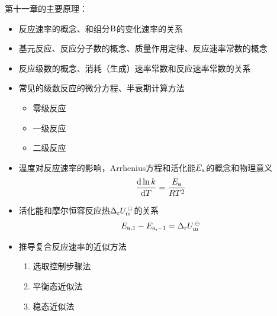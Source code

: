 \documentclass[9pt]{beamer}
\newcommand\B{{\rm B}}
\newcommand*{\dif}{\mathop{}\!\mathrm{d}}
\newcommand\m{{\rm m}}
\newcommand\rr{{\rm r}}
\begin{document}
	\begin{frame}
	
	第十一章的主要原理：
	\begin{itemize}
	
	\item 反应速率的概念、和组分$\B$的变化速率的关系
		
	\item 基元反应、反应分子数的概念、质量作用定律、反应速率常数的概念
	
	\item 反应级数的概念、消耗（生成）速率常数和反应速率常数的关系
	
	\item 常见的级数反应的微分方程、半衰期计算方法
		\begin{itemize}
	
		\item 零级反应
		
		\item 一级反应
		
		\item 二级反应
	
		\end{itemize}
		
	\item 温度对反应速率的影响，Arrhenius方程和活化能$E_{\rm a}$的概念和物理意义
	\[
		\frac{ \dif \ln{k} }{ \dif T } = \frac{ E_{\rm a} }{ RT^2 }
	\]
	
	\item 活化能和摩尔恒容反应热$\Delta_\rr U^{\,\ominus}_\m$的关系
	\[
		E_{\rm a,1} - E_{\rm a,-1} = \Delta_\rr U^{\,\ominus}_\m
	\]
	
	\item 推导复合反应速率的近似方法
		\begin{enumerate}
		
		\item 选取控制步骤法
	
		\item 平衡态近似法
		
		\item 稳态近似法
	
		\end{enumerate}		
	
	
	\end{itemize}
	
	\end{frame}
	
\end{document}
